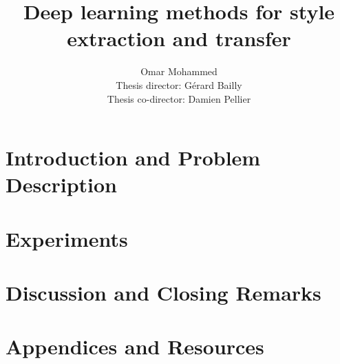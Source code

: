 \documentclass[11pt,a4paper,twoside, leqno]{book}
\title{Deep learning methods for style extraction and transfer}
\author{Omar Mohammed\\
Thesis director: G\'erard Bailly\\
Thesis co-director: Damien Pellier}
\date{}
\begin{document}
\maketitle

\dominitoc%
\tableofcontents

\listoffigures

\listoftables

\part{Introduction and Problem Description}





\part{Experiments}






\part{Discussion and Closing Remarks}




\part{Appendices and Resources}
\appendix





\end{document}
